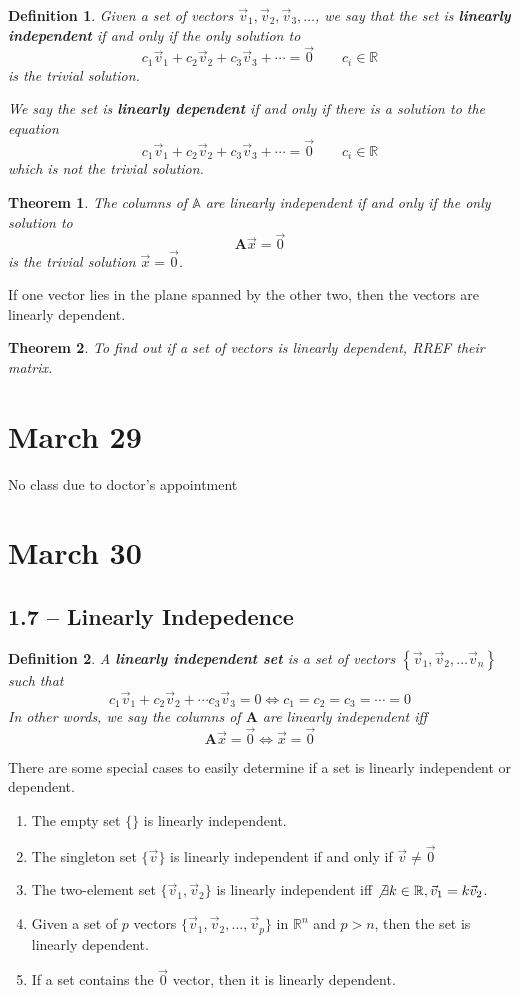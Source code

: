 \documentclass[11pt]{article}
\newtheorem{thm}{Theorem}
\newtheorem{defn}{Definition}
\begin{document}
\begin{defn}
  Given a set of vectors $\vec{v}_{1}, \vec{v}_{2}, \vec{v}_{3}, \ldots$, we say that the set is \textbf{linearly independent}
  if and only if the only solution to
  \[c_{1}\vec{v}_{1} + c_{2}\vec{v}_{2} + c_{3}\vec{v}_{3} + \cdots = \vec{0} \qquad c_{i} \in \mathbb{R}\]
  is the trivial solution.

  We say the set is \textbf{linearly dependent} if and only if there is a solution to the equation
  \[c_{1}\vec{v}_{1} + c_{2}\vec{v}_{2} + c_{3}\vec{v}_{3} + \cdots = \vec{0}\qquad c_{i} \in \mathbb{R}\]
  which is not the trivial solution.
\end{defn}

\begin{thm}
  The columns of $\mathbb{A}$ are linearly independent if and only if the only solution to
  \[\mathbf{A}\vec{x} = \vec{0}\]
  is the trivial solution $\vec{x} = \vec{0}$.
\end{thm}
If one vector lies in the plane spanned by the other two, then the vectors are linearly dependent.
\begin{thm}
  To find out if a set of vectors is linearly dependent, RREF their matrix.
\end{thm}
\section{March 29}
No class due to doctor's appointment
\section{March 30}
\subsection{1.7 -- Linearly Indepedence}
\begin{defn}
  A \textbf{linearly independent set} is a set of vectors $\left\{\vec{v}_{1}, \vec{v}_{2}, \ldots \vec{v}_{n}\right\}$ such that
  \[c_{1}\vec{v}_{1} + c_{2}\vec{v}_{2} + \cdots c_{3}\vec{v}_{3} = 0 \iff c_{1} = c_{2} = c_{3} = \cdots = 0 \]
  In other words, we say the columns of $\mathbf{A}$ are linearly independent iff
  \[\mathbf{A}\vec{x} = \vec{0} \iff \vec{x} = \vec{0}\]
\end{defn}

There are some special cases to easily determine if a set is linearly independent or dependent.
\begin{enumerate}
  \item The empty set $\{\}$ is linearly independent.
  \item The singleton set $\{\vec{v}\}$ is linearly independent if and only if $\vec{v} \neq \vec{0}$
  \item The two-element set $\{\vec{v}_{1}, \vec{v}_{2}\}$ is linearly independent iff $\not\exists k \in \mathbb{R}, \vec{v}_{1} = k\vec{v}_{2}$.
  \item Given a set of $p$ vectors $\{\vec{v}_{1}, \vec{v}_{2}, \ldots, \vec{v}_{p}\}$ in $\mathbb{R}^{n}$ and $p > n$, then the set is linearly dependent.
  \item If a set contains the $\vec{0}$ vector, then it is linearly dependent.
\end{enumerate}
\end{document}
